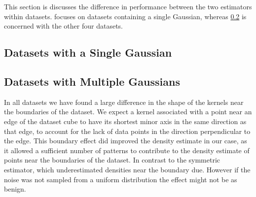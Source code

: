 This section is discusses the difference in performance between the two estimators within datasets.  focuses on datasets containing a single Gaussian, whereas \cref{s:discussion:multipleGaussians} is concerned with the other four datasets.

\subsection{Datasets with a Single Gaussian}
	\label{s:discussion:singleGaussian}
	


\subsection{Datasets with Multiple Gaussians}
	\label{s:discussion:multipleGaussians}
	

In all datasets we have found a large difference in the shape of the kernels near the boundaries of the dataset. We expect a kernel associated with a point near an edge of the dataset cube to have its shortest minor axis in the same direction as that edge, to account for the lack of data points in the direction perpendicular to the edge. This boundary effect did improved the density estimate in our case, as it allowed a sufficient number of patterns to contribute to the density estimate of points near the boundaries of the dataset. In contrast to the symmetric estimator, which underestimated densities near the boundary due. However if the noise was not sampled from a uniform distribution the effect might not be as benign. 
